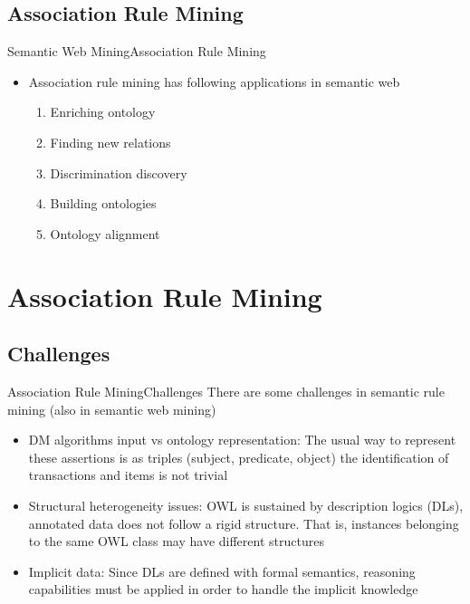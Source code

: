 \documentclass[10pt]{beamer}
\begin{document}
\subsection{Association Rule Mining}
\begin{frame}{Semantic Web Mining}{Association Rule Mining}
\begin{itemize}
		 
	\item Association rule mining has following applications in semantic web
		\begin{enumerate}
			\item Enriching ontology \cite{abedjan2014amending} \cite{d2012semantic}
			\item Finding new relations \cite{abedjan2013improving}
			\item Discrimination discovery \cite{luong2016classification}
			\item Building ontologies \cite{das2016semantic}
			\item Ontology alignment 
			\cite{galarraga2013mining}
			
		\end{enumerate}
\end{itemize}
\end{frame}

\section{Association Rule Mining}
\subsection{Challenges}
\begin{frame}{Association Rule Mining}{Challenges}
	There are some challenges in semantic rule mining (also in semantic web mining)  \cite{nebot2012finding}
	\begin{itemize}
		 
		\item  DM algorithms input vs ontology representation: The usual way to represent these assertions is as triples (subject, predicate, object) the identification of transactions and items is not trivial
		\item Structural heterogeneity issues: OWL is sustained by description logics (DLs), annotated data does not follow a rigid structure. That is, instances belonging to the same OWL class may have different structures
		\item Implicit data: Since DLs are defined with formal semantics, reasoning capabilities must be applied in order to handle the implicit knowledge 
	\end{itemize}
\end{frame}
\end{document}

